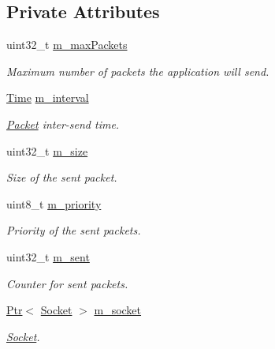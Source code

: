 \subsection*{Private Attributes}
\begin{DoxyCompactItemize}
\item 
uint32\+\_\+t \hyperlink{classns3_1_1PacketSocketClient_a817894ce70a1b601173d05024b75fe34}{m\+\_\+max\+Packets}
\begin{DoxyCompactList}\small\item\em Maximum number of packets the application will send. \end{DoxyCompactList}\item 
\hyperlink{classns3_1_1Time}{Time} \hyperlink{classns3_1_1PacketSocketClient_afb41dce3dd3ac9e9cf003bf6cac01cdc}{m\+\_\+interval}
\begin{DoxyCompactList}\small\item\em \hyperlink{classns3_1_1Packet}{Packet} inter-\/send time. \end{DoxyCompactList}\item 
uint32\+\_\+t \hyperlink{classns3_1_1PacketSocketClient_ae7e5d512ebeee9d3fb2c9a72f201dc63}{m\+\_\+size}
\begin{DoxyCompactList}\small\item\em Size of the sent packet. \end{DoxyCompactList}\item 
uint8\+\_\+t \hyperlink{classns3_1_1PacketSocketClient_aed618e34c7c3b8cedc831b14c6d4129f}{m\+\_\+priority}
\begin{DoxyCompactList}\small\item\em Priority of the sent packets. \end{DoxyCompactList}\item 
uint32\+\_\+t \hyperlink{classns3_1_1PacketSocketClient_a0b6afb6f2a5ad93754287c67f0966222}{m\+\_\+sent}
\begin{DoxyCompactList}\small\item\em Counter for sent packets. \end{DoxyCompactList}\item 
\hyperlink{classns3_1_1Ptr}{Ptr}$<$ \hyperlink{classns3_1_1Socket}{Socket} $>$ \hyperlink{classns3_1_1PacketSocketClient_a4eb98581ecf226bdf7d43696b0429306}{m\+\_\+socket}
\begin{DoxyCompactList}\small\item\em \hyperlink{classns3_1_1Socket}{Socket}. \end{DoxyCompactList}\item 

\end{DoxyCompactItemize}

